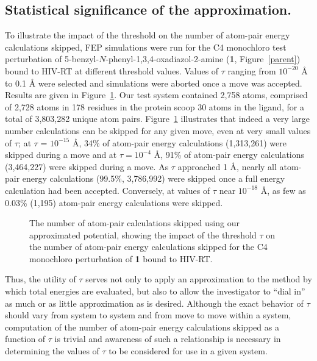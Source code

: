 \documentclass[12pt]{report}
\def\figlab{Figure}\def\figslab{\figlab s}
\newcommand*\fig[1]{\figlab~\ref{#1}}
\begin{document}

\subsection{Statistical significance of the approximation.}

To illustrate the impact of the threshold on the number of atom-pair energy calculations skipped, FEP simulations were run for the C4 monochloro test perturbation of 5-benzyl-$N$-phenyl-1,3,4-oxadiazol-2-amine (\textbf{1}, \fig{parent}) bound to HIV-RT at different threshold values. Values of $\tau$ ranging from $10^{-20}$ \AA{} to 0.1 \AA{} were selected and simulations were aborted once a move was accepted. Results are given in \fig{nskip}. Our test system contained 2,758 atoms, comprised of 2,728 atoms in 178 residues in the protein scoop 30 atoms in the ligand, for a total of 3,803,282 unique atom pairs. \fig{nskip} illustrates that indeed a very large number calculations can be skipped for any given move, even at very small values of $\tau$; at $\tau$ = $10^{-15}$ \AA, 34\% of atom-pair energy calculations (1,313,261) were skipped during a move and at $\tau = 10^{-4}$ \AA, 91\% of atom-pair energy calculations (3,464,227) were skipped during a move. As $\tau$ approached 1 \AA, nearly all atom-pair energy calculations (99.5\%, 3,786,992) were skipped once a full energy calculation had been accepted. Conversely, at values of $\tau$ near $10^{-18}$ \AA, as few as 0.03\% (1,195) atom-pair energy calculations were skipped.

\begin{figure}[t!]
\centering

\caption{The number of atom-pair calculations skipped using our approximated potential, showing the impact of the threshold $\tau$ on the number of atom-pair energy calculations skipped for the C4 monochloro perturbation of \textbf{1} bound to HIV-RT.}
\label{nskip}
\end{figure}

Thus, the utility of $\tau$ serves not only to apply an approximation to the method by which total energies are evaluated, but also to allow the investigator to ``dial in'' as much or as little approximation as is desired. Although the exact behavior of $\tau$ should vary from system to system and from move to move within a system, computation of the number of atom-pair energy calculations skipped as a function of $\tau$ is trivial and awareness of such a relationship is necessary in determining the values of $\tau$ to be considered for use in a given system.
\end{document}
